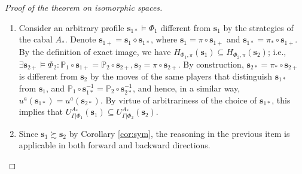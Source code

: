 \begin{proof}[Proof of the theorem on isomorphic spaces]
\begin{enumerate}
		\item Consider an arbitrary profile $\mathbf{s}_{1*} \models \Phi_1$ different from $\mathbf{s}_1$ by the strategies of the cabal $A_*$. Denote $\mathbf{s}_{1+} = \mathbf{s}_1 \diamond \mathbf{s}_{1*}$, where $\mathbf{s}_1 = \pi \circ \mathbf{s}_{1+}$ and $\mathbf{s}_{1*} = \pi_* \circ \mathbf{s}_{1+}$. By the definition of exact image, we have $H_{\Phi_1,\pi}(\mathbf{s}_1) \subseteq H_{\Phi_2,\pi}(\mathbf{s}_2)$; i.e., $\exists \mathbf{s}_{2+} \models \Phi_2 : \mathbb{P}_1 \circ \mathbf{s}_{1+} = \mathbb{P}_2 \circ \mathbf{s}_{2+}, \mathbf{s}_2 = \pi \circ \mathbf{s}_{2+}$. By construction, $\mathbf{s}_{2*} = \pi_* \circ \mathbf{s}_{2+}$ is different from $\mathbf{s}_2$ by the moves of the same players that distinguish $\mathbf{s}_{1*}$ from $\mathbf{s}_1$, and $\mathbb{P}_1 \circ \mathbf{s}_{1*}^{-1} = \mathbb{P}_2 \circ \mathbf{s}_{2*}^{-1}$, and hence, in a similar way, $u^a(\mathbf{s}_{1*}) = u^a(\mathbf{s}_{2*})$. By virtue of arbitrariness of the choice of $\mathbf{s}_{1*}$, this implies that $U_{\Gamma | \Phi_1}^{A_*}(\mathbf{s}_1) \subseteq U_{\Gamma | \Phi_2}^{A_*}(\mathbf{s}_2)$. %
		\item Since $\mathbf{s}_1 \succsim \mathbf{s}_2$ by Corollary \ref{cor:sym}, the reasoning in the previous item is applicable in both forward and backward directions. %
	\end{enumerate}
\end{proof}

